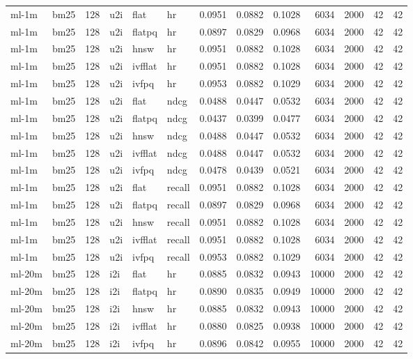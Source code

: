 \begin{tabular}{llrlllrrrrrrr}
ml-1m & bm25 & 128 & u2i & flat & hr & 0.0951 & 0.0882 & 0.1028 & 6034 & 2000 & 42 & 42 \\
ml-1m & bm25 & 128 & u2i & flatpq & hr & 0.0897 & 0.0829 & 0.0968 & 6034 & 2000 & 42 & 42 \\
ml-1m & bm25 & 128 & u2i & hnsw & hr & 0.0951 & 0.0882 & 0.1028 & 6034 & 2000 & 42 & 42 \\
ml-1m & bm25 & 128 & u2i & ivfflat & hr & 0.0951 & 0.0882 & 0.1028 & 6034 & 2000 & 42 & 42 \\
ml-1m & bm25 & 128 & u2i & ivfpq & hr & 0.0953 & 0.0882 & 0.1029 & 6034 & 2000 & 42 & 42 \\
ml-1m & bm25 & 128 & u2i & flat & ndcg & 0.0488 & 0.0447 & 0.0532 & 6034 & 2000 & 42 & 42 \\
ml-1m & bm25 & 128 & u2i & flatpq & ndcg & 0.0437 & 0.0399 & 0.0477 & 6034 & 2000 & 42 & 42 \\
ml-1m & bm25 & 128 & u2i & hnsw & ndcg & 0.0488 & 0.0447 & 0.0532 & 6034 & 2000 & 42 & 42 \\
ml-1m & bm25 & 128 & u2i & ivfflat & ndcg & 0.0488 & 0.0447 & 0.0532 & 6034 & 2000 & 42 & 42 \\
ml-1m & bm25 & 128 & u2i & ivfpq & ndcg & 0.0478 & 0.0439 & 0.0521 & 6034 & 2000 & 42 & 42 \\
ml-1m & bm25 & 128 & u2i & flat & recall & 0.0951 & 0.0882 & 0.1028 & 6034 & 2000 & 42 & 42 \\
ml-1m & bm25 & 128 & u2i & flatpq & recall & 0.0897 & 0.0829 & 0.0968 & 6034 & 2000 & 42 & 42 \\
ml-1m & bm25 & 128 & u2i & hnsw & recall & 0.0951 & 0.0882 & 0.1028 & 6034 & 2000 & 42 & 42 \\
ml-1m & bm25 & 128 & u2i & ivfflat & recall & 0.0951 & 0.0882 & 0.1028 & 6034 & 2000 & 42 & 42 \\
ml-1m & bm25 & 128 & u2i & ivfpq & recall & 0.0953 & 0.0882 & 0.1029 & 6034 & 2000 & 42 & 42 \\
ml-20m & bm25 & 128 & i2i & flat & hr & 0.0885 & 0.0832 & 0.0943 & 10000 & 2000 & 42 & 42 \\
ml-20m & bm25 & 128 & i2i & flatpq & hr & 0.0890 & 0.0835 & 0.0949 & 10000 & 2000 & 42 & 42 \\
ml-20m & bm25 & 128 & i2i & hnsw & hr & 0.0885 & 0.0832 & 0.0943 & 10000 & 2000 & 42 & 42 \\
ml-20m & bm25 & 128 & i2i & ivfflat & hr & 0.0880 & 0.0825 & 0.0938 & 10000 & 2000 & 42 & 42 \\
ml-20m & bm25 & 128 & i2i & ivfpq & hr & 0.0896 & 0.0842 & 0.0955 & 10000 & 2000 & 42 & 42 \\

\end{tabular}
